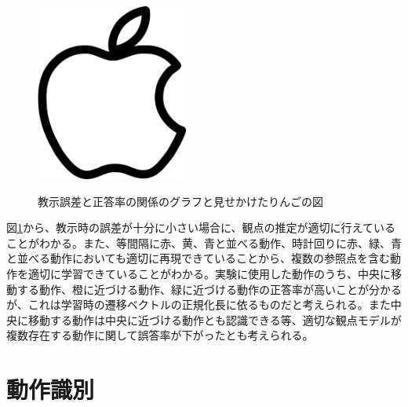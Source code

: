 	\begin{figure}[h]
		\begin{center}
			\includegraphics[width=5cm]{apple.png} \\ %
			\caption{教示誤差と正答率の関係のグラフと見せかけたりんごの図}
			\label{figure:success_rate}
		\end{center}
	\end{figure}

図\ref{figure:success_rate}から、教示時の誤差が十分に小さい場合に、観点の推定が適切に行えていることがわかる。また、等間隔に赤、黄、青と並べる動作、時計回りに赤、緑、青と並べる動作においても適切に再現できていることから、複数の参照点を含む動作を適切に学習できていることがわかる。実験に使用した動作のうち、中央に移動する動作、橙に近づける動作、緑に近づける動作の正答率が高いことが分かるが、これは学習時の遷移ベクトルの正規化長に依るものだと考えられる。また中央に移動する動作は中央に近づける動作とも認識できる等、適切な観点モデルが複数存在する動作に関して誤答率が下がったとも考えられる。




\section{動作識別}

